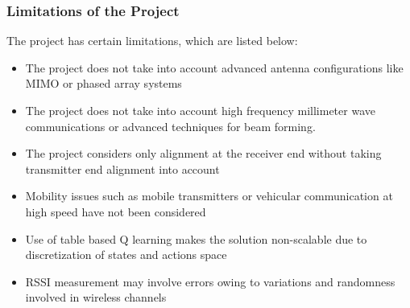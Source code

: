 \subsubsection{Limitations of the Project}

The project has certain limitations, which are listed below:
\begin{itemize}
    \item The project does not take into account advanced antenna configurations like MIMO or phased array systems
    \item The project does not take into account high frequency millimeter wave communications or advanced techniques for beam forming.
    \item The project considers only alignment at the receiver end without taking transmitter end alignment into account
    \item Mobility issues such as mobile transmitters or vehicular communication at high speed have not been considered
    \item Use of table based Q learning makes the solution non-scalable due to discretization of states and actions space
    \item RSSI measurement may involve errors owing to variations and randomness involved in wireless channels
\end{itemize}